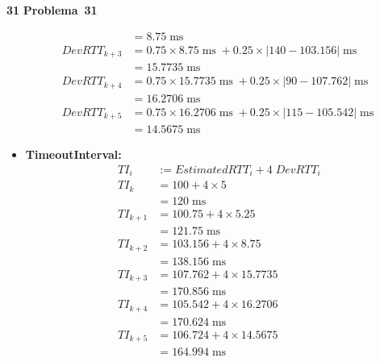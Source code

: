 \documentclass{article}
\newcounter{exe-list}
\newenvironment{exe}[2][Problema]
    {\newcommand{\opt}{(Opcional)}%
    \newcommand{\sketch}[1]{{\bfseries Rascunho:} ##1}%
    \medskip\par\noindent\ifthenelse{\equal{#1}{}}
        {\textbf{\large #2}}
        {\textbf{\large #1~#2}}%
    \medskip\par\noindent}
    {\medskip}
\DeclareMathOperator{\ms}{ms}
\begin{document}
\begin{exe}{31}
\begin{itemize}
\begin{align*}
                &= 8.75 \ms \\
                DevRTT_{k+3} &= 0.75 \times 8.75 \ms
                    + 0.25 \times |140 - 103.156| \ms \\
                &= 15.7735 \ms \\
                DevRTT_{k+4} &= 0.75 \times 15.7735 \ms
                    + 0.25 \times |90 - 107.762| \ms \\
                &= 16.2706 \ms \\
                DevRTT_{k+5} &= 0.75 \times 16.2706 \ms
                    + 0.25 \times |115 - 105.542| \ms \\
                &= 14.5675 \ms
            \end{align*}
        \item \textbf{TimeoutInterval:}
            \begin{align*}
                TI_i &:= EstimatedRTT_i + 4 \; DevRTT_i \\
                TI_k &= 100 + 4 \times 5 \\
                &= 120 \ms \\
                TI_{k+1} &= 100.75 + 4 \times 5.25 \\
                &= 121.75 \ms \\
                TI_{k+2} &= 103.156 + 4 \times 8.75 \\
                &= 138.156 \ms \\
                TI_{k+3} &= 107.762 + 4 \times 15.7735 \\
                &= 170.856 \ms \\
                TI_{k+4} &= 105.542 + 4 \times 16.2706 \\
                &= 170.624 \ms \\
                TI_{k+5} &= 106.724 + 4 \times 14.5675 \\
                &= 164.994 \ms
            \end{align*}
    \end{itemize}
\end{exe}
\end{document}
